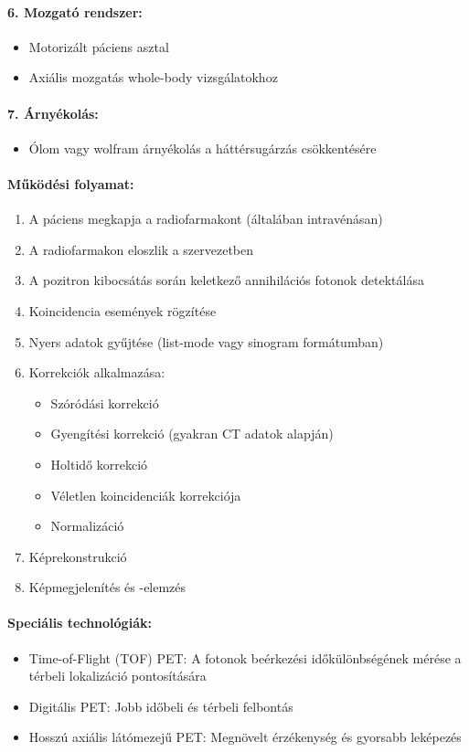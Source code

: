 \documentclass[a4paper,12pt]{article}
\begin{document}
\paragraph{6. Mozgató rendszer:} \begin{itemize} \item Motorizált páciens asztal \item Axiális mozgatás whole-body vizsgálatokhoz \end{itemize}

\paragraph{7. Árnyékolás:} \begin{itemize} \item Ólom vagy wolfram árnyékolás a háttérsugárzás csökkentésére \end{itemize}

\paragraph{Működési folyamat:} \begin{enumerate} \item A páciens megkapja a radiofarmakont (általában intravénásan) \item A radiofarmakon eloszlik a szervezetben \item A pozitron kibocsátás során keletkező annihilációs fotonok detektálása \item Koincidencia események rögzítése \item Nyers adatok gyűjtése (list-mode vagy sinogram formátumban) \item Korrekciók alkalmazása: \begin{itemize} \item Szóródási korrekció \item Gyengítési korrekció (gyakran CT adatok alapján) \item Holtidő korrekció \item Véletlen koincidenciák korrekciója \item Normalizáció \end{itemize} \item Képrekonstrukció \item Képmegjelenítés és -elemzés \end{enumerate}

\paragraph{Speciális technológiák:} \begin{itemize} \item Time-of-Flight (TOF) PET: A fotonok beérkezési időkülönbségének mérése a térbeli lokalizáció pontosítására \item Digitális PET: Jobb időbeli és térbeli felbontás \item Hosszú axiális látómezejű PET: Megnövelt érzékenység és gyorsabb leképezés \end{itemize}
\end{document}
